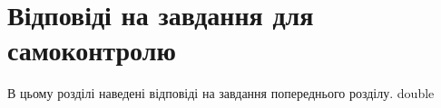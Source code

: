 \chapter{Відповіді на завдання для самоконтролю}
В цьому розділі наведені відповіді на завдання попереднього розділу.
{double}
